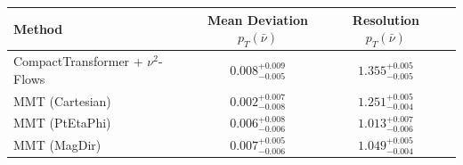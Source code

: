     \begin{tabular}{lccc}
        \toprule
        Method & Mean Deviation $p_{T}(\bar{\nu})$ & Resolution $p_{T}(\bar{\nu})$ \\
        \midrule
        CompactTransformer + $\nu^2$-Flows & $0.008^{+0.009}_{-0.005}$ & $1.355^{+0.005}_{-0.005}$ \\
        MMT (Cartesian) & $0.002^{+0.007}_{-0.008}$ & $1.251^{+0.005}_{-0.004}$ \\
        MMT (PtEtaPhi) & $0.006^{+0.008}_{-0.006}$ & $1.013^{+0.007}_{-0.006}$ \\
        MMT (MagDir) & $0.007^{+0.005}_{-0.006}$ & $1.049^{+0.005}_{-0.004}$ \\
        \bottomrule
    \end{tabular}